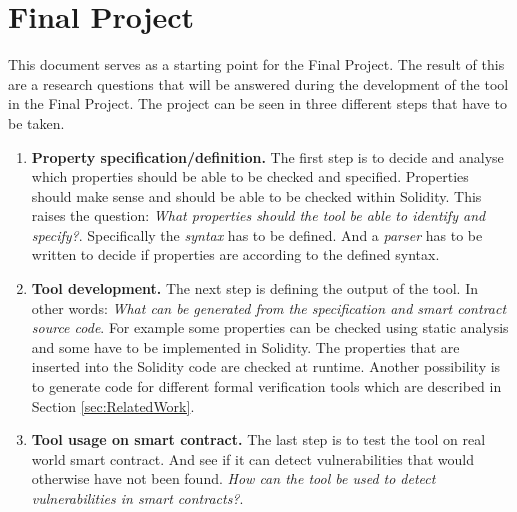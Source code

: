 \documentclass[a4paper]{article}
\begin{document}
\section{Final Project}
This document serves as a starting point for the Final Project. The result of this are a research questions that will be answered during the development of the tool in the Final Project. The project can be seen in three different steps that have to be taken.
\begin{enumerate}
    \item \textbf{Property specification/definition.}
    The first step is to decide and analyse which properties should be able to be checked and specified. Properties should make sense and should be able to be checked within Solidity. This raises the question:
    \textit{What properties should the tool be able to identify and specify?}. Specifically the \textit{syntax} has to be defined. And a \textit{parser} has to be written to decide if properties are according to the defined syntax. 
    \item \textbf{Tool development.}
    The next step is defining the output of the tool. In other words: \textit{What can be generated from the specification and smart contract source code}. For example some properties can be checked using static analysis and some have to be implemented in Solidity. The properties that are inserted into the Solidity code are checked at runtime. Another possibility is to generate code for different formal verification tools which are described in Section \ref{sec:RelatedWork}.
    \item \textbf{Tool usage on smart contract.}
    The last step is to test the tool on real world smart contract. And see if it can detect vulnerabilities that would otherwise have not been found. \textit{How can the tool be used to detect vulnerabilities in smart contracts?}.
\end{enumerate}




\end{document}
